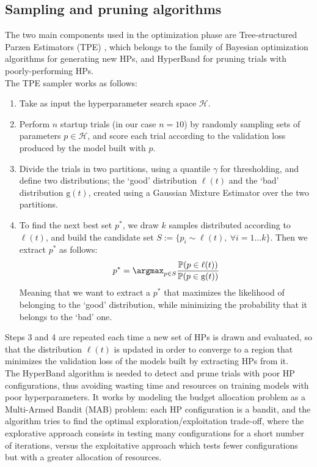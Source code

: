 \subsection{Sampling and pruning algorithms} %
\noindent
The two main components used in the optimization phase are Tree-structured Parzen Estimators (TPE) \cite{bergstra2011algorithms}, which belongs to the family of Bayesian optimization algorithms for generating new HPs, and HyperBand \cite{li2018hyperband} for pruning trials with poorly-performing HPs.\\
The TPE sampler works as follows:
\begin{enumerate}
    \item Take as input the hyperparameter search space $\mathcal{H}$.
    \item Perform $n$ startup trials (in our case $n = 10$) by randomly sampling sets of parameters $p\in\mathcal{H}$, and score each trial according to the validation loss produced by the model built with $p$.
    \item Divide the trials in two partitions, using a quantile $\gamma$ for thresholding, and define two distributions; the `good' distribution $\ell(t)$ and the `bad' distribution $\mathrm{g}(t)$, created using a Gaussian Mixture Estimator over the two partitions.
    \item To find the next best set $p^*$, we draw $k$ samples distributed according to $\ell(t)$, and build the candidate set $S :=\{p_i\sim\ell(t),~\forall i = 1\dots k\}$. Then we extract $p^*$ as follows:
    $$ 
        p^* = \argmax_{p\in S} \frac{\mathbb{P}(p\in\ell(t))}{\mathbb{P}(p\in\mathrm{g}(t))}
    $$
    Meaning that we want to extract a $p^*$ that maximizes the likelihood of belonging to the `good' distribution, while minimizing the probability that it belongs to the `bad' one.
\end{enumerate}

\noindent
Steps 3 and 4 are repeated each time a new set of HPs is drawn and evaluated, so that the distribution $\ell(t)$ is updated in order to converge to a region that minimizes the validation loss of the models built by extracting HPs from it.\\

\noindent
The HyperBand algorithm is needed to detect and prune trials with poor HP configurations, thus avoiding wasting time and resources on training models with poor hyperparameters. It works by modeling the budget allocation problem as a Multi-Armed Bandit (MAB) problem: each HP configuration is a bandit, and the algorithm tries to find the optimal exploration/exploitation trade-off, where the explorative approach consists in testing many configurations for a short number of iterations, versus the exploitative approach which tests fewer configurations but with a greater allocation of resources.

